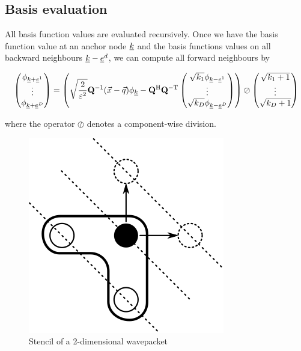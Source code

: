 \documentclass{article}
\begin{document}
\subsection{Basis evaluation}

All basis function values are evaluated recursively. Once we have the basis function
value at an anchor node \(\underline{k}\) and the basis functions values on all
backward neighbours \(\underline{k}-\underline{e}^d\), we can compute all
forward neighbours by

\begin{equation}
  \begin{pmatrix}
    \phi_{\underline{k}+\underline{e}^1} \\
    \vdots \\
    \phi_{\underline{k}+\underline{e}^D}
  \end{pmatrix}
  = \left(
    \sqrt{\frac{2}{\varepsilon^2}} \mathbf{Q}^\mathrm{-1} (\vec{x}-\vec{q}) \phi_{\underline{k}}
    - \mathbf{Q}^\mathrm{H} \mathbf{Q}^\mathrm{-T}
    \begin{pmatrix}
      \sqrt{k_1} \phi_{\underline{k}-\underline{e}^1} \\
      \vdots \\
      \sqrt{k_D} \phi_{\underline{k}-\underline{e}^D}
    \end{pmatrix}
  \right)
  \oslash
  \begin{pmatrix}
    \sqrt{k_1+1}\\
    \vdots \\
    \sqrt{k_D+1}
  \end{pmatrix}
\end{equation}

where the operator \(\oslash\) denotes a component-wise division.

\begin{figure}[H]
  \centering
  \includegraphics[]{basis_eval_stencil}
  \caption{Stencil of a 2-dimensional wavepacket}
\end{figure}
\end{document}
